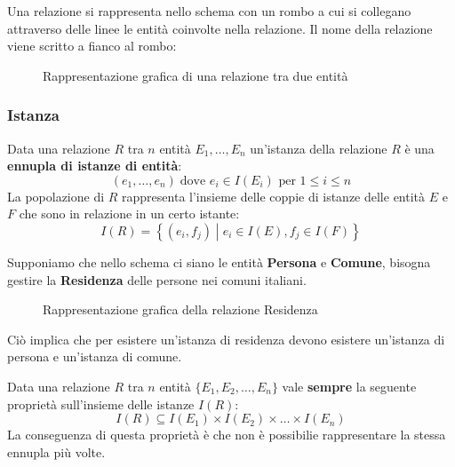\documentclass[a4paper]{article}
\begin{document}
\vspace{1em}
\noindent
Una relazione si rappresenta nello schema con un rombo a cui si collegano attraverso delle
linee le entità coinvolte nella relazione. Il nome della relazione viene scritto a fianco
al rombo:
\begin{figure}[H]
  \centering
  \caption{Rappresentazione grafica di una relazione tra due entità}
\end{figure}

\subsubsection{Istanza}
Data una relazione \( R \) tra \( n \) entità \( E_1, \ldots, E_n \) un'istanza della
relazione \( R \) è una \textbf{ennupla di istanze di entità}:
\[
  (e_1, \ldots, e_n) \; \text{dove } e_i \in I(E_i) \text{ per } 1 \le i \le n
\] 
La popolazione di \( R \) rappresenta l'insieme delle coppie di istanze delle entità
\( E \) e \( F \) che sono in relazione in un certo istante:
\[
  I(R) = \left\{ (e_i, f_j) \;\left|\; e_i \in I(E), f_j \in I(F) \right.\right\} 
\]
\ex{}
{
  Supponiamo che nello schema ci siano le entità \textbf{Persona} e \textbf{Comune},
  bisogna gestire la \textbf{Residenza} delle persone nei comuni italiani.

  \begin{figure}[H]
    \centering
    \caption{Rappresentazione grafica della relazione Residenza}
  \end{figure}
  \noindent
  Ciò implica che per esistere un'istanza di residenza devono esistere un'istanza
  di persona e un'istanza di comune.
}
Data una relazione \( R \) tra \( n \) entità \( \{E_1, E_2, \ldots, E_n\} \)
vale \textbf{sempre} la seguente proprietà sull'insieme delle istanze \( I(R) \):
\[
  I(R) \subseteq I(E_1) \times I(E_2) \times \ldots \times I(E_n)
\] 
La conseguenza di questa proprietà è che non è possibilie rappresentare la stessa ennupla
più volte.
\end{document}
